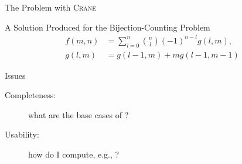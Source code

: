 \documentclass{beamer}
\newcommand{\Cranetwo}{\textsc{Crane2}}
\begin{document}
\begin{frame}{The Problem with \textsc{Crane}}
  \begin{block}{A Solution Produced for the Bijection-Counting Problem}
  \begin{align*}
    f(m, n) &= \sum_{l=0}^{n} \binom{n}{l}{(-1)}^{n-l}g(l, m),\\
    g(l, m) &= g(l-1, m) + mg(l-1, m-1)
  \end{align*}
  \end{block}
  \pause
  \begin{alertblock}{Issues}
    \begin{description}
      \item[Completeness:] what are the base cases of ?
      \item[Usability:] how do I compute, e.g., ?
    \end{description}
  \end{alertblock}
\end{frame}




\end{document}
